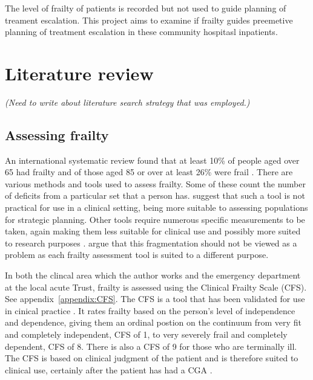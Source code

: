 \documentclass
[
	12pt,
	a4paper,
	oneside,
]{article}
\begin{document}
The level of frailty of patients is recorded but not used to guide planning of
treament escalation. This project aims to examine if frailty guides preemetive
planning of treatment escalation in these community hospitasl inpatients.

\section{Literature review}

\emph{(Need to write about literature search strategy that was employed.)}

\subsection{Assessing frailty}
An international systematic review found 
that at least 10\% of people aged over 65 had frailty and of those aged 85 or over
at least 26\% were frail \parencite{collard:12}. There are various methods and tools used to assess frailty.
Some of these count the number of deficits from a particular set that a person has. 
\textcite{sternberg:08} suggest that such a tool is not practical for use in a clinical
setting, being more suitable to assessing populations for strategic planning. 
Other tools require numerous specific measurements to be taken, again making them
less suitable for clinical use \parencite{martin:08} and possibly more suited to research purposes
\parencite{ensrud:08}. \textcite{romero-ortuno:16} argue that this fragmentation should not
be viewed as a problem as each frailty assessment tool is suited to a different 
purpose. 

In both the clincal area which the author works and the emergency department at
the local acute Trust, frailty is assessed using the Clinical Frailty Scale (CFS).
See appendix~\ref{appendix:CFS}.
The CFS is a tool that has been validated for use in cinical practice 
\parencite{rockwood:05}. It rates frailty based on the person's level of independence
and dependence, giving them an ordinal postion on the continuum from very fit and completely 
independent, CFS of 1, to very severely frail and completely dependent, CFS of 8.
There is also a CFS of 9 for those who are terminally ill. The CFS is based on clinical
judgment of the patient and is therefore suited to clinical use, certainly after
the patient has had a CGA \parencite{bgs:14}.
\end{document}
